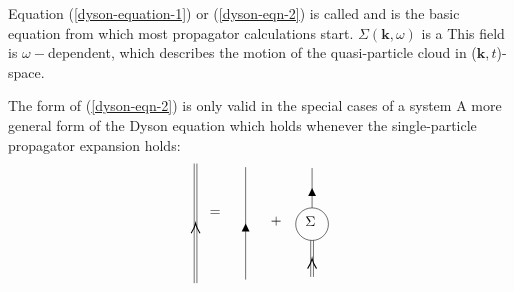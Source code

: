 Equation (\ref{dyson-equation-1}) or (\ref{dyson-eqn-2}) is called  and is the basic equation from which most propagator calculations start. $\Sigma(\mathbf{k},\omega)$ is a \textbf{} This field is $\omega-$dependent, which describes the motion of the quasi-particle cloud in ($\mathbf{k},t$)-space.

\begin{imp}
The form of (\ref{dyson-eqn-2}) is only valid in the special cases of a system  A more general form of the Dyson equation which holds whenever the single-particle propagator expansion holds:
\begin{equation}
\begin{tikzpicture}[x=0.65pt,y=0.65pt,yscale=-1,xscale=1]
\draw    (103.5,63.1) -- (103.5,195)(100.5,63.1) -- (100.5,195) ;
\draw [shift={(102,129.05)}, rotate = 90] [color={rgb, 255:red, 0; green, 0; blue, 0 }  ][line width=0.75]    (10.93,-4.9) .. controls (6.95,-2.3) and (3.31,-0.67) .. (0,0) .. controls (3.31,0.67) and (6.95,2.3) .. (10.93,4.9)   ;
\draw    (157,67.1) -- (157,191.1) ;
\draw [shift={(157,129.1)}, rotate = 90] [fill={rgb, 255:red, 0; green, 0; blue, 0 }  ][line width=0.08]  [draw opacity=0] (8.93,-4.29) -- (0,0) -- (8.93,4.29) -- cycle    ;
\draw   (212,129.96) .. controls (212,120.04) and (220.04,112) .. (229.96,112) .. controls (239.88,112) and (247.92,120.04) .. (247.92,129.96) .. controls (247.92,139.88) and (239.88,147.92) .. (229.96,147.92) .. controls (220.04,147.92) and (212,139.88) .. (212,129.96) -- cycle ;
\draw    (229.96,112) -- (229.96,68.1) ;
\draw [shift={(229.96,90.05)}, rotate = 450] [fill={rgb, 255:red, 0; green, 0; blue, 0 }  ][line width=0.08]  [draw opacity=0] (8.93,-4.29) -- (0,0) -- (8.93,4.29) -- cycle    ;
\draw    (228.46,188.1) -- (228.46,147.92)(231.46,188.1) -- (231.46,147.92) ;
\draw [shift={(229.96,168.01)}, rotate = 450] [color={rgb, 255:red, 0; green, 0; blue, 0 }  ][line width=0.75]    (10.93,-4.9) .. controls (6.95,-2.3) and (3.31,-0.67) .. (0,0) .. controls (3.31,0.67) and (6.95,2.3) .. (10.93,4.9)   ;

\draw (221,120) node [anchor=north west][inner sep=0.75pt]    {$\Sigma $};
\draw (116,113) node [anchor=north west][inner sep=0.75pt]    {$=$};
\draw (183,120) node [anchor=north west][inner sep=0.75pt]    {$+$};


\end{tikzpicture}
\label{generalized-dyson-eqn}
\end{equation}
\end{imp}
